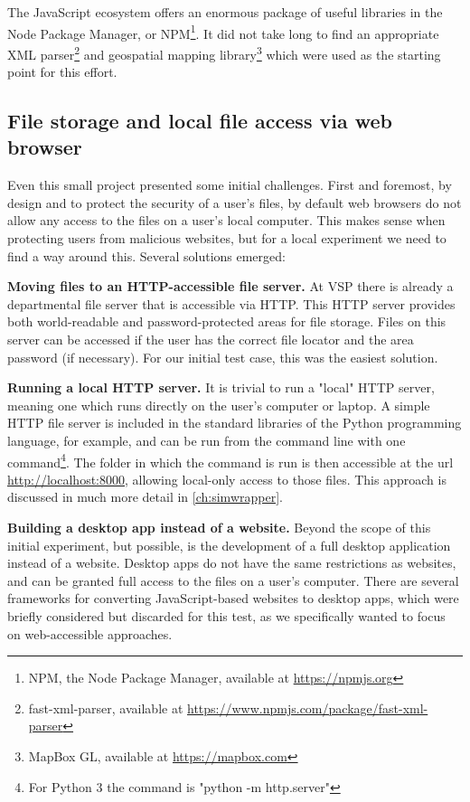 The JavaScript ecosystem offers an enormous package of useful libraries in the Node Package Manager, or NPM\footnote{NPM, the Node Package Manager, available at \url{https://npmjs.org}}. It did not take long to find an appropriate XML parser\footnote[1]{fast-xml-parser, available at \url{https://www.npmjs.com/package/fast-xml-parser}} and geospatial mapping library\footnote[2]{MapBox GL, available at \url{https://mapbox.com}} which were used as the starting point for this effort.

\hypertarget{server-experiments-files}{%
\subsection{File storage and local file access via web browser}
\label{server-experiments-files}}

Even this small project presented some initial challenges. First and foremost, by design and to protect the security of a user's files, by default web browsers do not allow any access to the files on a user's local computer. This makes sense when protecting users from malicious websites, but for a local experiment we need to find a way around this. Several solutions emerged:

\textbf{Moving files to an HTTP-accessible file server.} At VSP there is already a departmental file server that is accessible via \gls{HTTP}. This HTTP server provides both world-readable and password-protected areas for file storage. Files on this server can be accessed if the user has the correct file locator and the area password (if necessary). For our initial test case, this was the easiest solution.

\textbf{Running a local HTTP server.} It is trivial to run a "local" HTTP server, meaning one which runs directly on the user's computer or laptop. A simple HTTP file server is included in the standard libraries of the Python programming language, for example, and can be run from the command line with one command\footnote{For Python 3 the command is "python -m http.server"}. The folder in which the command is run is then accessible at the url \url{http://localhost:8000}, allowing local-only access to those files. This approach is discussed in much more detail in \autoref{ch:simwrapper}.

\textbf{Building a desktop app instead of a website.} Beyond the scope of this initial experiment, but possible, is the development of a full desktop application instead of a website. Desktop apps do not have the same restrictions as websites, and can be granted full access to the files on a user's computer. There are several frameworks for converting JavaScript-based websites to desktop apps, which were briefly considered but discarded for this test, as we specifically wanted to focus on web-accessible approaches.

